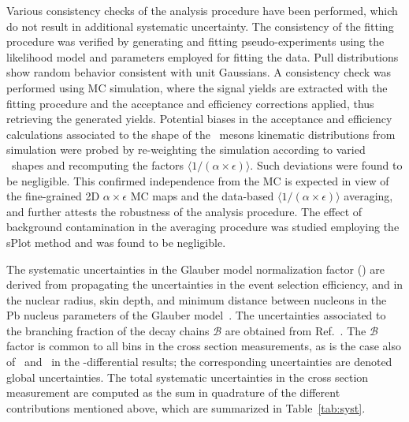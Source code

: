 Various consistency checks of the analysis procedure have been performed, which do not result in additional systematic uncertainty.
%
The consistency of the fitting procedure was verified by generating and fitting pseudo-experiments using the likelihood model and parameters employed for fitting the data. Pull distributions show random behavior consistent with unit Gaussians.
%
A consistency check %
was performed using MC simulation, where the signal yields are extracted with the fitting procedure and the acceptance and efficiency corrections applied, thus retrieving the generated yields. 
%
Potential biases in the acceptance and efficiency calculations associated to the shape of the \PB\ mesons kinematic distributions from simulation were probed by re-weighting the  {\PYTHIA} simulation according to varied \pt\ shapes %
 and recomputing the factors $\langle 1 / (\alpha\!\times\!\epsilon)\rangle$. Such deviations were found to be negligible. 
This confirmed independence from the MC is expected in view of the fine-grained 2D $\alpha\!\times\!\epsilon$ MC maps and the data-based $\langle 1 / (\alpha\!\times\!\epsilon)\rangle$ averaging, and further attests the robustness of the analysis procedure. 
The effect of background contamination %
in the averaging procedure was studied employing the sPlot method and was found to be negligible.  

%
The systematic uncertainties in the Glauber model normalization factor (\TAA) are derived from propagating the uncertainties in the event selection efficiency, and in the nuclear radius, skin depth, and minimum distance between nucleons in the Pb nucleus parameters of the Glauber model~\cite{Khachatryan:2016odn}. The uncertainties associated to the branching fraction of the decay chains $\mathcal{B}$ are obtained from Ref.~\cite{pdg2018}.
%
The $\mathcal{B}$ factor is common to all bins in the cross section measurements, as is the case also of \TAA\ and \NMB\ in the \pt-differential results; the corresponding uncertainties are denoted global uncertainties.  
%
%
The total systematic uncertainties in the cross section measurement are computed as the sum in quadrature of the different contributions mentioned above, which are summarized in Table~\ref{tab:syst}. 


